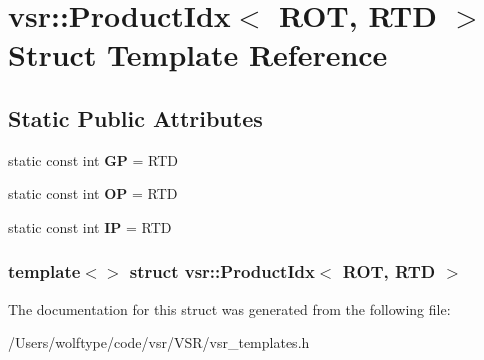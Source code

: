 \hypertarget{structvsr_1_1_product_idx_3_01_r_o_t_00_01_r_t_d_01_4}{\section{vsr\-:\-:Product\-Idx$<$ R\-O\-T, R\-T\-D $>$ Struct Template Reference}
\label{structvsr_1_1_product_idx_3_01_r_o_t_00_01_r_t_d_01_4}
}
\subsection*{Static Public Attributes}
\begin{DoxyCompactItemize}
\item 
\hypertarget{structvsr_1_1_product_idx_3_01_r_o_t_00_01_r_t_d_01_4_a74c2b8a5d69f273e4d58c0bd1eb31c5c}{static const int {\bfseries G\-P} = R\-T\-D}\label{structvsr_1_1_product_idx_3_01_r_o_t_00_01_r_t_d_01_4_a74c2b8a5d69f273e4d58c0bd1eb31c5c}

\item 
\hypertarget{structvsr_1_1_product_idx_3_01_r_o_t_00_01_r_t_d_01_4_a9cd918a0693b527dc90b35e9e6a2b0cd}{static const int {\bfseries O\-P} = R\-T\-D}\label{structvsr_1_1_product_idx_3_01_r_o_t_00_01_r_t_d_01_4_a9cd918a0693b527dc90b35e9e6a2b0cd}

\item 
\hypertarget{structvsr_1_1_product_idx_3_01_r_o_t_00_01_r_t_d_01_4_a4c05d753c8cdb06ba215261218a98c05}{static const int {\bfseries I\-P} = R\-T\-D}\label{structvsr_1_1_product_idx_3_01_r_o_t_00_01_r_t_d_01_4_a4c05d753c8cdb06ba215261218a98c05}

\end{DoxyCompactItemize}
\subsubsection*{template$<$$>$ struct vsr\-::\-Product\-Idx$<$ R\-O\-T, R\-T\-D $>$}



The documentation for this struct was generated from the following file\-:\begin{DoxyCompactItemize}
\item 
/\-Users/wolftype/code/vsr/\-V\-S\-R/vsr\-\_\-templates.\-h\end{DoxyCompactItemize}
